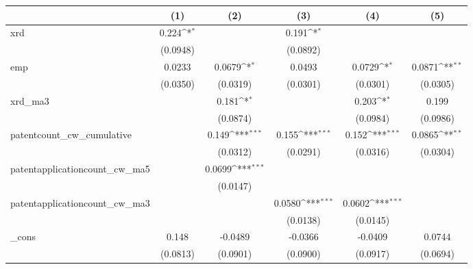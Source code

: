 {
\def\sym#1{\ifmmode^{#1}\else\(^{#1}\)\fi}
\begin{tabular}{l*{5}{c}}
\hline\hline
            &\multicolumn{1}{c}{(1)}         &\multicolumn{1}{c}{(2)}         &\multicolumn{1}{c}{(3)}         &\multicolumn{1}{c}{(4)}         &\multicolumn{1}{c}{(5)}         \\
\hline
xrd         &       0.224\sym{*}  &                     &       0.191\sym{*}  &                     &                     \\
            &    (0.0948)         &                     &    (0.0892)         &                     &                     \\
[1em]
emp         &      0.0233         &      0.0679\sym{*}  &      0.0493         &      0.0729\sym{*}  &      0.0871\sym{**} \\
            &    (0.0350)         &    (0.0319)         &    (0.0301)         &    (0.0301)         &    (0.0305)         \\
[1em]
xrd\_ma3     &                     &       0.181\sym{*}  &                     &       0.203\sym{*}  &       0.199         \\
            &                     &    (0.0874)         &                     &    (0.0984)         &    (0.0986)         \\
[1em]
patentcount\_cw\_cumulative&                     &       0.149\sym{***}&       0.155\sym{***}&       0.152\sym{***}&      0.0865\sym{**} \\
            &                     &    (0.0312)         &    (0.0291)         &    (0.0316)         &    (0.0304)         \\
[1em]
patentapplicationcount\_cw\_ma5&                     &      0.0699\sym{***}&                     &                     &                     \\
            &                     &    (0.0147)         &                     &                     &                     \\
[1em]
patentapplicationcount\_cw\_ma3&                     &                     &      0.0580\sym{***}&      0.0602\sym{***}&                     \\
            &                     &                     &    (0.0138)         &    (0.0145)         &                     \\
[1em]
\_cons      &       0.148         &     -0.0489         &     -0.0366         &     -0.0409         &      0.0744         \\
            &    (0.0813)         &    (0.0901)         &    (0.0900)         &    (0.0917)         &    (0.0694)         \\

\end{tabular}}
